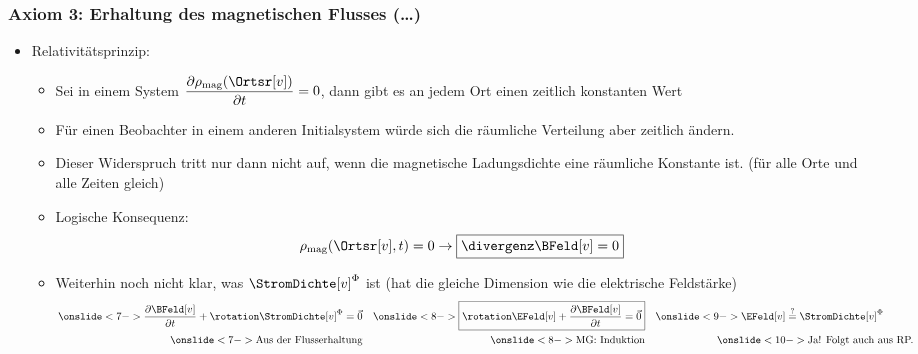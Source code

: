 \begin{frame}
  \frametitle{Axiom 3: Erhaltung des magnetischen Flusses (\dots)}
\begin{itemize}[<+->]
\item Relativitätsprinzip:
\begin{itemize}[<+->]
\item Sei in einem System \(\displaystyle \frac{\partial \rho_\text{mag} (\Ortsr[v])}{\partial t}=0\), dann gibt es an jedem Ort einen zeitlich konstanten Wert
  
\item Für einen Beobachter in einem anderen Initialsystem würde sich die räumliche Verteilung aber zeitlich ändern.
\item Dieser Widerspruch tritt nur dann nicht auf, wenn die magnetische Ladungsdichte eine räumliche Konstante ist. (für alle Orte und alle Zeiten gleich)
\item Logische Konsequenz: 
\begin{equation*}
\rho_\text{mag}(\Ortsr[v], t)=0 \to \boxed{\divergenz \BFeld[v] = 0}
\end{equation*}
\item Weiterhin noch nicht klar, was  \(\StromDichte[v]^\Phi\) ist (hat die gleiche Dimension wie die elektrische Feldstärke)
\begin{align*}
 \onslide<7->{\frac{\partial \BFeld[v]}{\partial t}+ \rotation \StromDichte[v]^\Phi = \vec{0}}
  && \onslide<8->{\boxed{\rotation\EFeld[v] + \frac{\partial \BFeld[v]}{\partial t} = \vec{0}}}
   && \onslide<9->{\EFeld[v] \stackrel{?}{=} \StromDichte[v]^\Phi \rule{1cm}{0pt}}\\
  \onslide<7->{\text{Aus der Flusserhaltung}}
  && \onslide<8->{\text{MG: Induktion}}
  && \onslide<10->{\text{Ja! Folgt auch aus RP.}}
\end{align*}
\end{itemize}
\end{itemize}
\end{frame}

